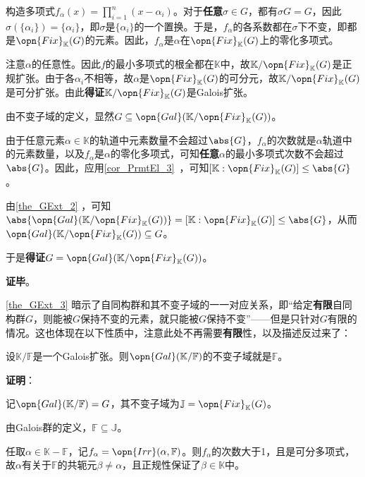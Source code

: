 构造多项式$f_\alpha(x)=\prod_{i=1}^n(x-\alpha_i)$。对于\textbf{任意}$\sigma\in G$，都有$\sigma G=G$，因此$\sigma(\{\alpha_i\})=\{\alpha_i\}$，即$\sigma$是$\{\alpha_i\}$的一个置换。于是，$f_\alpha$的各系数都在$\sigma$下不变，即都是$\opn{Fix}_\mathbb{K}(G)$的元素。因此，$f_\alpha$是$\alpha$在$\opn{Fix}_\mathbb{K}(G)$上的零化多项式。

注意$\alpha$的任意性。因此$f$的最小多项式的根全都在$\mathbb{K}$中，故$\mathbb{K}/\opn{Fix}_\mathbb{K}(G)$是正规扩张。由于各$\alpha_i$不相等，故$\alpha$是$\opn{Fix}_\mathbb{K}(G)$的可分元，故$\mathbb{K}/\opn{Fix}_\mathbb{K}(G)$是可分扩张。由此\textbf{得证}$\mathbb{K}/\opn{Fix}_\mathbb{K}(G)$是Galois扩张。

由不变子域的定义，显然$G\subseteq\opn{Gal}(\mathbb{K}/\opn{Fix}_\mathbb{K}(G))$。

由于任意元素$\alpha\in\mathbb{K}$的轨道中元素数量不会超过$\abs{G}$，$f_\alpha$的次数就是$\alpha$轨道中的元素数量，以及$f_\alpha$是$\alpha$的零化多项式，可知\textbf{任意}$\alpha$的最小多项式次数不会超过$\abs{G}$。因此，应用\autoref{cor_PrmtEl_3}~，可知$[\mathbb{K}:\opn{Fix}_\mathbb{K}(G)]\leq \abs{G}$。

由\autoref{the_GExt_2} ，可知$\abs{\opn{Gal}(\mathbb{K}/\opn{Fix}_\mathbb{K}(G))}=[\mathbb{K}:\opn{Fix}_\mathbb{K}(G)]\leq\abs{G}$，从而$\opn{Gal}(\mathbb{K}/\opn{Fix}_\mathbb{K}(G))\subseteq G$。

于是\textbf{得证}$G = \opn{Gal}(\mathbb{K}/\opn{Fix}_\mathbb{K}(G))$。

\textbf{证毕}。


\autoref{the_GExt_3} 暗示了自同构群和其不变子域的一一对应关系，即“给定\textbf{有限}自同构群$G$，则能被$G$保持不变的元素，就只能被$G$保持不变”——但是只针对$G$有限的情况。这也体现在以下性质中，注意此处不再需要\textbf{有限}性，以及描述反过来了：



\begin{theorem}{}\label{the_GExt_4}
设$\mathbb{K}/\mathbb{F}$是一个Galois扩张。则$\opn{Gal}(\mathbb{K}/\mathbb{F})$的不变子域就是$\mathbb{F}$。
\end{theorem}

\textbf{证明}：

记$\opn{Gal}(\mathbb{K}/\mathbb{F})=G$，其不变子域为$\mathbb{J}=\opn{Fix}_\mathbb{K}(G)$。

由Galois群的定义，$\mathbb{F}\subseteq\mathbb{J}$。

任取$\alpha\in\mathbb{K}-\mathbb{F}$，记$f_\alpha=\opn{Irr}(\alpha, \mathbb{F})$。则$f_\alpha$的次数大于1，且是可分多项式，故$\alpha$有关于$\mathbb{F}$的共轭元$\beta\neq \alpha$，且正规性保证了$\beta\in\mathbb{K}$中。

